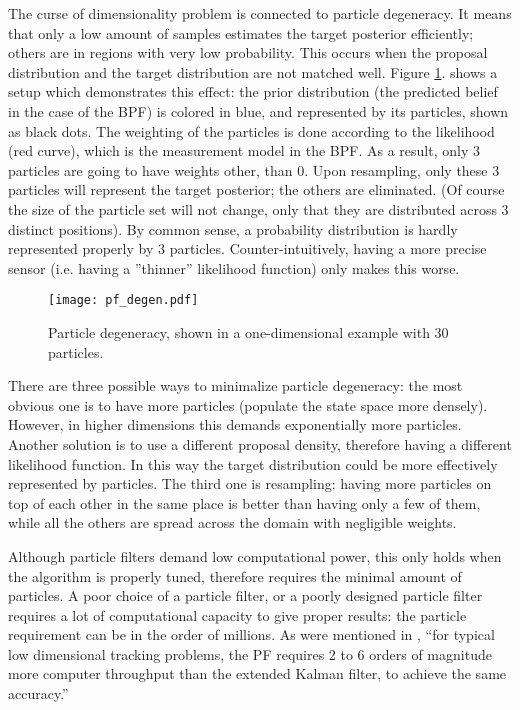 The curse of dimensionality problem is connected to particle degeneracy. It means that only a low amount of samples estimates the target posterior efficiently; others are in regions with very low probability. This occurs when the proposal distribution and the target distribution are not matched well. Figure \ref{fig:pf-degen}. shows a setup which demonstrates this effect: the prior distribution (the predicted belief in the case of the BPF) is colored in blue, and represented by its particles, shown as black dots. The weighting of the particles is done according to the likelihood (red curve), which is the measurement model in the BPF. As a result, only 3 particles are going to have weights other, than 0. Upon resampling, only these 3 particles will represent the target posterior; the others are eliminated. (Of course the size of the particle set will not change, only that they are distributed across 3 distinct positions). By common sense, a probability distribution is hardly represented properly by 3 particles. Counter-intuitively, having a more precise sensor (i.e. having a ''thinner'' likelihood function) only makes this worse.

\begin{figure}[htb!]
    \centering
    \texttt{[image: pf\_degen.pdf]}
    \caption{Particle degeneracy, shown in a one-dimensional example with 30 particles.}
    \label{fig:pf-degen}
\end{figure}
There are three possible ways to minimalize particle degeneracy: the most obvious one is to have more particles (populate the state space more densely). However, in higher dimensions this demands exponentially more particles. Another solution is to use a different proposal density, therefore having a different likelihood function. In this way the target distribution could be more effectively represented by particles. The third one is resampling: having more particles on top of each other in the same place is better than having only a few of them, while all the others are spread across the domain with negligible weights.


Although particle filters demand low computational power, this only holds when the algorithm is properly tuned, therefore requires the minimal amount of particles. A poor choice of a particle filter, or a poorly designed particle filter requires a lot of computational capacity to give proper results: the particle requirement can be in the order of millions. As were mentioned in \cite{Daum2003}, ``for typical low dimensional tracking problems, the PF requires 2 to 6 orders of magnitude more computer throughput than the extended Kalman filter, to achieve the same accuracy.''

